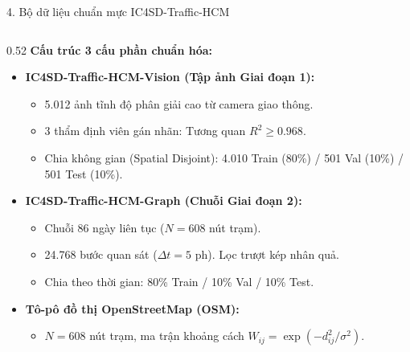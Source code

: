 \documentclass[aspectratio=169,10pt]{beamer}
\begin{document}
\begin{frame}{4. Bộ dữ liệu chuẩn mực IC4SD-Traffic-HCM}
  \begin{columns}[T]
    \begin{column}{0.52\textwidth}
      \textbf{\textcolor{ptitblue}{Cấu trúc 3 cấu phần chuẩn hóa:}}
      \begin{itemize}
        \footnotesize
        \item \textbf{IC4SD-Traffic-HCM-Vision (Tập ảnh Giai đoạn 1):}
          \begin{itemize}
            \scriptsize
            \item 5.012 ảnh tĩnh độ phân giải cao từ camera giao thông.
            \item 3 thẩm định viên gán nhãn: Tương quan $R^2 \ge 0.968$.
            \item Chia không gian (Spatial Disjoint): 4.010 Train (80\%) / 501 Val (10\%) / 501 Test (10\%).
          \end{itemize}
        \item \textbf{IC4SD-Traffic-HCM-Graph (Chuỗi Giai đoạn 2):}
          \begin{itemize}
            \scriptsize
            \item Chuỗi 86 ngày liên tục ($N=608$ nút trạm).
            \item 24.768 bước quan sát ($\Delta t = 5$ ph). Lọc trượt kép nhân quả.
            \item Chia theo thời gian: 80\% Train / 10\% Val / 10\% Test.
          \end{itemize}
        \item \textbf{Tô-pô đồ thị OpenStreetMap (OSM):}
          \begin{itemize}
            \scriptsize
            \item $N = 608$ nút trạm, ma trận khoảng cách $W_{ij} = \exp(-d_{ij}^2/\sigma^2)$.
          \end{itemize}
      \end{itemize}
    \end{column}


\end{columns}
\end{frame}
\end{document}
